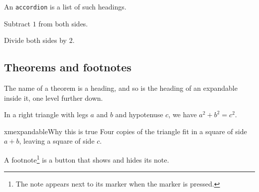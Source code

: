 \documentclass{ximera}
\begin{document}
An \texttt{accordion} is a list of such headings.

\begin{accordion}
\begin{accordion-item}
Subtract $1$ from both sides.
\end{accordion-item}
\begin{accordion-item}
Divide both sides by $2$.
\end{accordion-item}
\end{accordion}

\subsection{Theorems and footnotes}

The name of a theorem is a heading, and so is the heading of an expandable
inside it, one level further down.

\begin{theorem}[Pythagoras]
In a right triangle with legs $a$ and $b$ and hypotenuse $c$, we have
$a^2+b^2=c^2$.

\begin{expandable}{xmexpandable}{Why this is true}
Four copies of the triangle fit in a square of side $a+b$, leaving a square
of side $c$.
\end{expandable}
\end{theorem}

A footnote\footnote{The note appears next to its marker when the marker is
pressed.} is a button that shows and hides its note.
\end{document}
